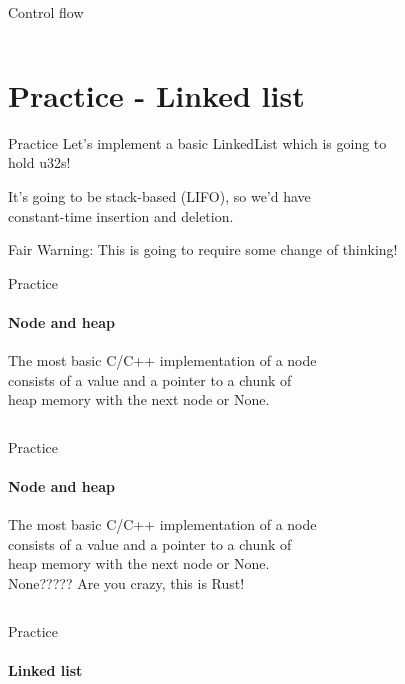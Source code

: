 \documentclass[usenames,dvipsnames,10pt,aspectratio=169]{beamer}
\begin{document}
\begin{frame}{Control flow}
\large
\inputminted[fontsize=\footnotesize]{rust}{code/control.rs}
\vspace{0.5cm}
\vspace{0.2cm}
\end{frame}


\section{Practice - Linked list}

\begin{frame}{Practice}
\normalsize
Let's implement a basic LinkedList which is going to\\
hold \textcolor{ucuyellow}{u32}s!
\vspace{0.2cm}

It's going to be stack-based (LIFO), so we'd have\\
constant-time insertion and deletion.
\vspace{0.2cm}

Fair Warning: This is going to require some change of thinking!
\end{frame}

\begin{frame}{Practice}
\framesubtitle{Node and heap}
The most basic C/C++ implementation of a node\\
consists of a value and a pointer to a chunk of\\
heap memory with the next node or None.
\vspace{0.2cm}
\inputminted[fontsize=\large]{rust}{code/list1.rs}
\end{frame}

\begin{frame}{Practice}
\framesubtitle{Node and heap}
The most basic C/C++ implementation of a node\\
consists of a value and a pointer to a chunk of\\
heap memory with the next node or None.\\
\vspace{0.2cm}
\textcolor{ucuyellow}{None????? Are you crazy, this is Rust!}
\vspace{0.2cm}
\inputminted[fontsize=\large]{rust}{code/list2.rs}
\end{frame}

\begin{frame}{Practice}
\framesubtitle{Linked list}
\inputminted[fontsize=\normalsize]{rust}{code/list3.rs}
\vspace{0.5cm}
\inputminted[fontsize=\normalsize]{rust}{code/list4.rs}
\end{frame}
\end{document}
